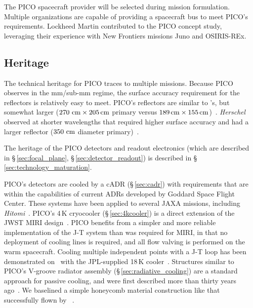 The PICO spacecraft provider will be selected during mission formulation. Multiple organizations are capable of providing a spacecraft bus to meet PICO's requirements. Lockheed Martin contributed to the PICO concept study, leveraging their experience with New Frontiers missions Juno and OSIRIS-REx.
 
\subsection{Heritage}
\label{sec:heritage} %

The technical heritage for PICO traces to multiple missions. Because PICO observes in the mm/sub-mm regime, the surface accuracy requirement for the reflectors is relatively easy to meet. PICO's reflectors are similar to \planck 's, but somewhat larger ($270 \,\, {\rm cm} \times 205\,{\rm cm}$ primary versus $189\,{\rm cm} \times 155\,{\rm cm}$)~\citep{Gloesener2006}. \textit{Herschel} observed at shorter wavelengths that required higher surface accuracy and had a larger reflector ($350\, \,{\rm cm}$ diameter primary)~\citep{Toulemont2004}.

The heritage of the PICO detectors and readout electronics (which are described in \S\,\ref{sec:focal_plane}, \S\,\ref{sec:detector_readout}) is described in \S\,\ref{sec:technology_maturation}.

PICO's detectors are cooled by a cADR (\S\,\ref{sec:cadr}) with requirements that are within the capabilities of current ADRs developed by Goddard Space Flight Center. These systems have been applied to several JAXA missions, including \textit{Hitomi}~\citep{Shirron2016}. PICO's 4\,K cryocooler (\S\,\ref{sec:4kcooler}) is a direct extension of the JWST MIRI design~\citep{Durand2008,Rabb2013}. PICO benefits from a simpler and more reliable implementation of the J-T system than was required for MIRI, in that no deployment of cooling lines is required, and all flow valving is performed on the warm spacecraft. Cooling multiple independent points with a J-T loop has been demonstrated on \planck\ with the JPL-supplied 18\,K cooler~\citep{Planck2011}. Structures similar to PICO's V-groove radiator assembly (\S\,\ref{sec:radiative_cooling}) are a standard approach for passive cooling, and were first described more than thirty years ago~\citep{Bard1987}. We baselined a simple honeycomb material construction like that successfully flown by \planck~\citep{ESA2009,Planck2011}.

